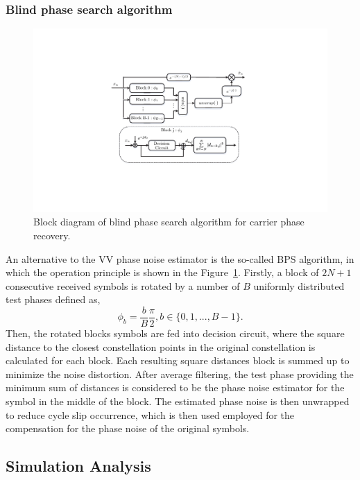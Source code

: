 \subsubsection{Blind phase search algorithm}
\begin{figure}[h!]
    \centering
    \includegraphics[width=12cm]{./sdf/dsp_laser_phase_compensation/figures/bps_diagram.pdf}
    \caption{Block diagram of blind phase search algorithm for carrier phase recovery.}
    \label{fig_BPSdiagram}
\end{figure}
An alternative to the VV phase noise estimator is the so-called BPS algorithm, in which the operation principle is shown in the Figure~\ref{fig_BPSdiagram}. Firstly, a block of $2N+1$ consecutive received symbols is rotated by a number of $B$ uniformly distributed test phases defined as,
\begin{equation}
    	\phi_{b} = \frac{b}{B}\frac{\pi}{2}, b \in\{0,1,...,B-1\}.
    \label{eq_phaseNoise}
\end{equation}
Then, the rotated blocks symbols are fed into decision circuit, where the square distance to the closest constellation points in the original constellation is calculated for each block. Each resulting square distances block is summed up to minimize the noise distortion. After average filtering, the test phase providing the minimum sum of distances is considered to be the phase noise estimator for the symbol in the middle of the block. The estimated phase noise is then unwrapped to reduce cycle slip occurrence, which is then used employed for the compensation for the phase noise of the original symbols.

\subsection{Simulation Analysis}

